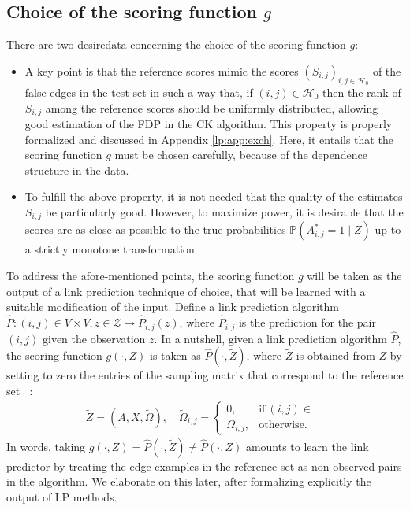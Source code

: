 \documentclass[a4paper, 11pt]{article}
\theoremstyle{remark}
\renewcommand{\P}{\mathbb{P}}
\DeclareMathOperator{\Dcal}{\cD_{\text{cal}}}
\newcommand{\EM}{\ensuremath}
\newcommand{\cD}{\EM{\mathcal{D}}}
\newcommand{\cH}{\EM{\mathcal{H}}}
\newcommand{\cZ}{\EM{\mathcal{Z}}}
\begin{document}
\subsection{Choice of the scoring function $g$}  \label{lp:sec:meth:score}

There are two desiredata concerning the choice of the scoring function $g$: 
\begin{itemize}
\item [(i)] A key point is that the reference scores mimic the scores $(S_{i,j})_{i,j \in \cH_0}$ of the false edges in the test set in such a way that, if $(i,j) \in \cH_0$ then
the rank of $S_{i,j}$ among the reference scores should be uniformly distributed, allowing good estimation of the FDP in the CK algorithm. 
This property is properly formalized and discussed in Appendix  \ref{lp:app:exch}.
Here, it entails that the scoring function $g$ must be chosen carefully, because of the dependence structure in the data. 
\item [(ii)]To fulfill the above property, it is not needed that the quality of the estimates $S_{i,j}$ be particularly good. However, to maximize power, it is desirable that the scores are as close as possible to the true probabilities $\P( A^*_{i,j}=1 \; \vert \; Z)$ up to a strictly monotone transformation. %
\end{itemize}



To address the afore-mentioned points, the scoring function $g$ will be taken as the output of a link prediction technique of choice, that will be learned with a suitable modification of the input. 
Define a link prediction algorithm $\hat P \colon (i,j) \in V \times V, z \in \cZ \mapsto \hat P_{i,j} (z)$, where $\hat P_{i,j}$ is the prediction for the pair $(i,j)$ given the observation $z$. In a nutshell, given a link prediction algorithm $\hat P$, the scoring function $g (\cdot, Z) $ is taken as 
$\hat P( \cdot, \tilde Z)$, where $\tilde Z$ is obtained from $Z$ by setting to zero the entries of the sampling matrix that correspond to the reference set $\Dcal$:
\begin{align} \label{lp:eq:inputmodif}
\tilde Z = (A, X, \tilde \Omega), \quad \tilde \Omega_{i,j}= \begin{cases}
      0, & \text{if}\ (i,j) \in \Dcal  \\
      \Omega_{i,j}, & \text{otherwise.}
    \end{cases}
\end{align}
In words, taking $g(\cdot,Z) = \hat P( \cdot, \tilde Z) \neq \hat P(\cdot, Z)$  amounts to learn the link predictor by treating the edge examples in the reference set as non-observed pairs in the algorithm.
We elaborate on this later, after formalizing explicitly the output of LP methods.
\end{document}
